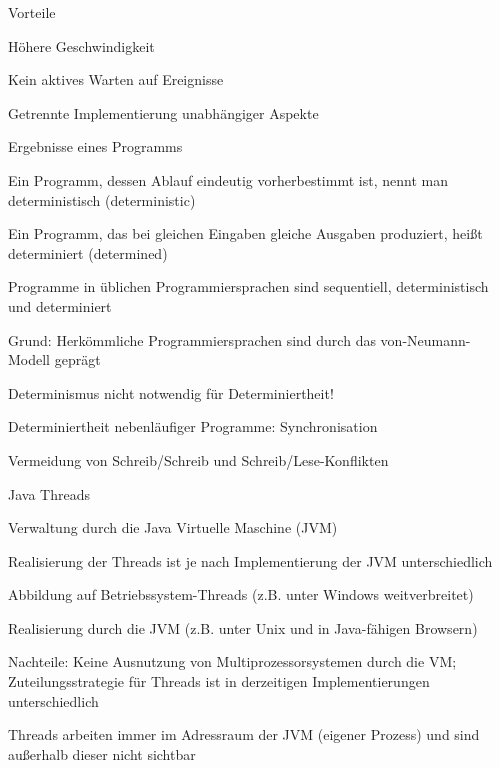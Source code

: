 \documentclass[a4paper]{article}
\begin{document}
\begin{multicols}{3}
  Vorteile
  \begin{itemize*}
    \item Höhere Geschwindigkeit
    \item Kein aktives Warten auf Ereignisse
    \item Getrennte Implementierung unabhängiger Aspekte
  \end{itemize*}

  Ergebnisse eines Programms
  \begin{itemize*}
    \item Ein Programm, dessen Ablauf eindeutig vorherbestimmt ist, nennt man deterministisch (deterministic)
    \item Ein Programm, das bei gleichen Eingaben gleiche Ausgaben produziert, heißt determiniert (determined)
    \item Programme in üblichen Programmiersprachen sind sequentiell, deterministisch und determiniert
    \item Grund: Herkömmliche Programmiersprachen sind durch das von-Neumann-Modell geprägt
    \item Determinismus nicht notwendig für Determiniertheit!
          \begin{itemize*}
            \item Determiniertheit nebenläufiger Programme: Synchronisation
            \item Vermeidung von Schreib/Schreib und Schreib/Lese-Konflikten
          \end{itemize*}
  \end{itemize*}

  Java Threads
  \begin{itemize*}
    \item Verwaltung durch die Java Virtuelle Maschine (JVM)
    \item Realisierung der Threads ist je nach Implementierung der JVM unterschiedlich
          \begin{itemize*}
            \item Abbildung auf Betriebssystem-Threads (z.B. unter Windows weitverbreitet)
            \item Realisierung durch die JVM (z.B. unter Unix und in Java-fähigen Browsern)
            \item Nachteile: Keine Ausnutzung von Multiprozessorsystemen durch die VM; Zuteilungsstrategie für Threads ist in derzeitigen Implementierungen unterschiedlich
          \end{itemize*}
    \item Threads arbeiten immer im Adressraum der JVM (eigener Prozess) und sind außerhalb dieser nicht sichtbar
  \end{itemize*}


\end{multicols}
\end{document}
